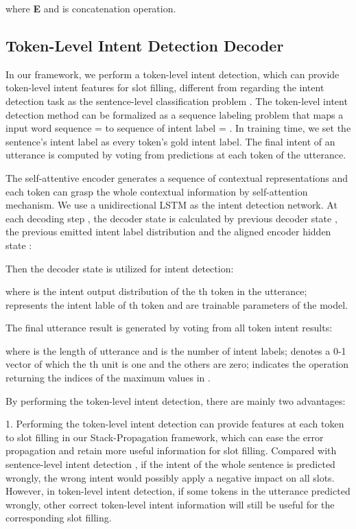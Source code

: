 \documentclass[11pt,a4paper]{article}
\begin{document}
where {\bf{E}}   and  is concatenation operation.


\subsection{Token-Level Intent Detection Decoder}

In our framework, we perform a token-level intent detection, which can provide 
token-level intent features for slot filling, different from regarding 
the intent detection task as the sentence-level classification problem 
\cite{liu2016attention}.
The token-level intent detection method can be formalized as a sequence labeling problem that
maps a input word sequence  =  to
sequence of intent label  = . 
In training time, we set the sentence's intent label as every token's gold intent label.
The final intent of an utterance is computed by voting from predictions 
at each token of the utterance.

The self-attentive encoder generates a 
sequence of contextual representations  and each 
token can grasp the whole contextual information by self-attention mechanism. We use a unidirectional LSTM as the intent detection network. 
At each decoding step , the decoder state  is 
calculated by previous decoder state , the previous 
emitted intent label distribution  
and the aligned encoder hidden state :


Then the decoder state  is utilized for intent detection:

where  is the intent output distribution of the th token in the utterance;  represents the intent lable of th token and  are trainable parameters of the model.

The final utterance result  is generated by 
voting from all token intent results:

where  is the length of utterance and  is the number of 
intent labels;  denotes a  0-1 vector  
     of which the th unit is one and the 
others are zero;   indicates the operation  returning 
the indices of the maximum values in .

By performing the token-level intent detection, there are mainly two advantages: 

1. Performing the token-level intent detection can provide features at each token to slot filling in our Stack-Propagation framework, which can ease the error propagation and retain more useful information for slot filling. Compared with sentence-level intent detection \cite{li2018self},
if the intent of the whole sentence is predicted wrongly, the wrong intent would possibly apply a negative impact on all slots. However, in token-level intent detection, if some tokens in the utterance predicted wrongly, other correct token-level intent information will still be useful for the corresponding slot filling.
\end{document}
